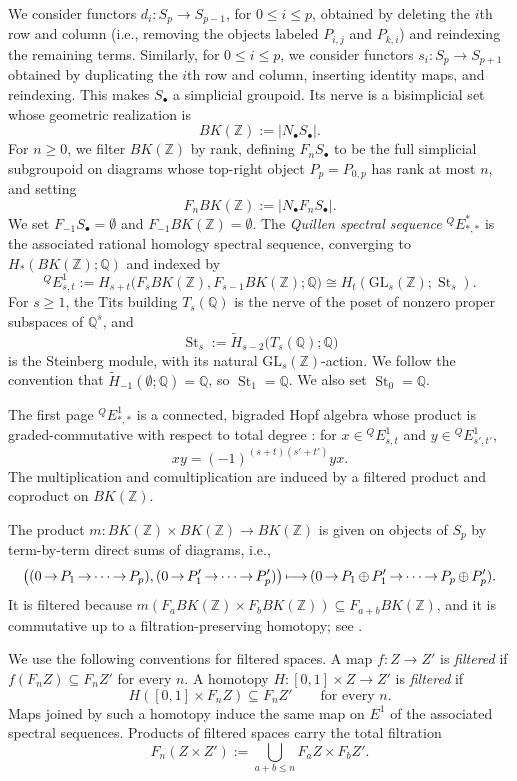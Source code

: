 \documentclass[12 pt]{amsart}
\newcommand{\QQ}{\mathbb{Q}}
\newcommand{\ZZ}{\mathbb{Z}}
\newcommand{\EQ}{{}^{Q}\!E}
\newcommand{\St}{\operatorname{St}}
\newcommand{\GL}{\mathrm{GL}}
\newcommand{\<}{\langle}
\renewcommand{\>}{\rangle}
\theoremstyle{definition}
\begin{document}
We consider functors $d_i \colon S_p \to S_{p - 1}$, for $0 \leq i \leq p$, obtained by deleting the $i$th row and column (i.e., removing the objects labeled $P_{i, j}$ and $P_{k, i}$) and reindexing the remaining terms. Similarly, for $0 \leq i \leq p$, we consider functors $s_i \colon S_p \to S_{p + 1}$ obtained by duplicating the $i$th row and column, inserting identity maps, and reindexing. This makes $S_\bullet$ a simplicial groupoid. Its nerve is a bisimplicial set whose geometric realization is
\[
BK(\ZZ) := |N_\bullet S_\bullet |.
\]
For $n \geq 0$, we filter $BK(\ZZ)$ by rank, defining $F_n S_\bullet$ to be the full simplicial subgroupoid on diagrams whose top-right object $P_p = P_{0, p}$ has rank at most $n$, and setting
\[
F_n BK(\ZZ) := |N_\bullet F_n S_\bullet |.
\]
We set $F_{-1} S_\bullet = \emptyset$ and $F_{-1} BK(\ZZ) = \emptyset$. The \emph{Quillen spectral sequence} $\EQ^*_{*, *}$ is the associated rational homology spectral sequence, converging to $H_*(BK(\ZZ); \QQ)$ and indexed by
\[
\EQ^1_{s, t} := H_{s + t}\bigl(F_s BK(\ZZ), F_{s - 1} BK(\ZZ); \QQ\bigr) \cong H_t(\GL_s(\ZZ); \St_s).
\]
For $s \geq 1$, the Tits building $T_s(\QQ)$ is the nerve of the poset of nonzero proper subspaces of $\QQ^s$, and
\[
\St_s := \widetilde H_{s - 2}\bigl(T_s(\QQ); \QQ\bigr)
\]
is the Steinberg module, with its natural $\GL_s(\ZZ)$-action. We follow the convention that $\widetilde H_{-1}(\emptyset; \QQ) = \QQ$, so $\St_1 = \QQ$.  We also set $\St_0 = \QQ$.

\medskip

The first page $\EQ^1_{*, *}$ is a connected, bigraded Hopf algebra whose product is graded-commutative with respect to total degree \cite[Theorem~3.18]{BCGP}: for $x \in \EQ^1_{s, t}$ and $y \in \EQ^1_{s', t'}$,
\[
xy = (-1)^{(s + t)(s' + t')} yx.
\]
The multiplication and comultiplication are induced by a filtered product and coproduct on $BK(\ZZ)$.

The product $m \colon BK(\ZZ) \times BK(\ZZ) \to BK(\ZZ)$ is given on objects of $S_p$ by term-by-term direct sums of diagrams, i.e.,
\[
\thickmuskip=3mu
\medmuskip=3mu
\bigl((0 \to P_1 \to \cdots \to P_p), (0 \to P'_1 \to \cdots \to P'_p)\bigr) \longmapsto (0 \to P_1 \oplus P'_1 \to \cdots \to P_p \oplus P'_p).
\]
It is filtered because $m(F_a BK(\ZZ) \times F_b BK(\ZZ)) \subseteq F_{a + b} BK(\ZZ)$, and it is commutative up to a filtration-preserving homotopy; see \cite[Propositions~3.13 and~3.16]{BCGP}.

We use the following conventions for filtered spaces. A map $f \colon Z \to Z'$ is \emph{filtered} if $f(F_n Z) \subseteq F_n Z'$ for every $n$. A homotopy $H \colon [0, 1] \times Z \to Z'$ is \emph{filtered} if
\[
H([0, 1] \times F_n Z) \subseteq F_n Z' \qquad \text{for every } n.
\]
Maps joined by such a homotopy induce the same map on $E^1$ of the associated spectral sequences. Products of filtered spaces carry the total filtration
\[
F_n(Z \times Z') := \bigcup_{a + b \leq n} F_a Z \times F_b Z'.
\]
\end{document}
